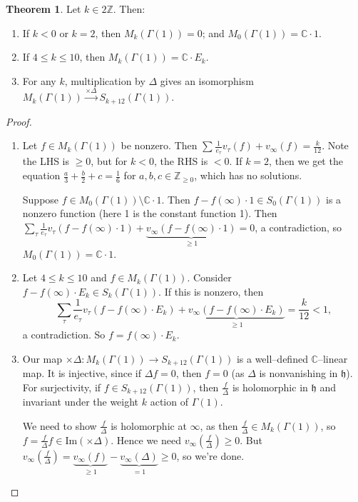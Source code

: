 \documentclass{article}
\theoremstyle{definition}
\newtheorem{theorem}{Theorem}[section]
\begin{document}
\begin{theorem}
    Let $k \in 2\mathbb{Z}$. Then:
    \begin{enumerate}[(1)]
        \item If $k<0$ or $k=2$, then $M_k(\Gamma(1)) = 0$; and $M_0(\Gamma(1)) = \mathbb{C} \cdot 1$.
        \item If $4\le k\le 10$, then $M_k(\Gamma(1)) = \mathbb{C} \cdot E_k$. 
        \item For any $k$, multiplication by $\Delta$ gives an isomorphism $M_k(\Gamma(1)) \stackrel{\times \Delta}{\to}  S_{k+12}(\Gamma(1))$.
    \end{enumerate}
\end{theorem}
\begin{proof}
    \begin{enumerate}[(1)]
        \item Let $f \in M_k(\Gamma(1))$ be nonzero. Then $\sum_{}^{} \frac{1}{e_{\tau}}v_{\tau}(f) + v_{\infty}(f) = \frac{k}{12}$. Note the LHS is $\ge 0$, but for $k<0$, the RHS is $<0$. If $k=2$, then we get the equation $\frac{a}{3}+\frac{b}{2}+c = \frac{1}{6}$ for $a,b,c \in \mathbb{Z}_{\ge 0}$, which has no solutions.
        \vspace{1mm}
         
        Suppose $f \in M_0(\Gamma(1)) \setminus \mathbb{C}\cdot 1$. Then $f - f(\infty) \cdot 1  \in S_0(\Gamma(1))$ is a nonzero function (here 1 is the constant function 1). Then $\sum_{\tau}^{} \frac{1}{e_{\tau}}v_{\tau}(f-f(\infty)\cdot 1) + \underbrace{v_{\infty}(f-f(\infty)\cdot 1)}_{\ge 1} = 0$, a contradiction, so $M_0(\Gamma(1)) = \mathbb{C}\cdot 1$.
        \item Let $4\le k\le 10$ and $f \in M_k(\Gamma(1))$. Consider $f - f(\infty)\cdot E_k \in S_k(\Gamma(1))$. If this is nonzero, then \[
        \sum_{\tau}^{} \frac{1}{e_\tau}v_{\tau}(f-f(\infty)\cdot E_k) + \underbrace{v_{\infty}(f-f(\infty)\cdot E_k)}_{\ge 1} = \frac{k}{12}<1,
        \]
        a contradiction. So $f = f(\infty)\cdot E_k$.
        \item Our map $\times \Delta : M_k(\Gamma(1)) \to S_{k+12}(\Gamma(1))$ is a well--defined $\mathbb{C}$--linear map. It is injective, since if $\Delta f = 0$, then $f = 0$ (as $\Delta$ is nonvanishing in $\mathfrak{h}$). For surjectivity, if $f \in S_{k+12}(\Gamma(1))$, then $\frac{f}{\Delta}$ is holomorphic in $\mathfrak{h}$ and invariant under the weight $k$ action of $\Gamma(1)$. 
        \vspace{1mm}
         
        We need to show $\frac{f}{\Delta}$ is holomorphic at $\infty$, as then $\frac{f}{\Delta} \in M_k(\Gamma(1))$, so $f = \frac{f}{\Delta}f \in \text{Im}(\times \Delta)$. Hence we need $v_{\infty}\left(\frac{f}{\Delta}\right) \ge 0$. But $v_{\infty}\left(\frac{f}{\Delta}\right) = \underbrace{v_{\infty}(f)}_{\ge 1} - \underbrace{v_{\infty}(\Delta)}_{=1} \ge 0$, so we're done.
    \end{enumerate}
\end{proof}
\end{document}
